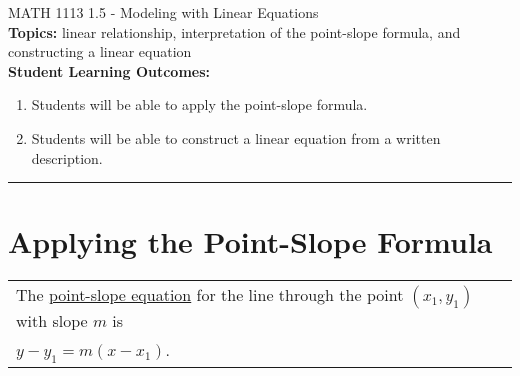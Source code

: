 \documentclass[11pt]{article}
\begin{document}
\noindent MATH 1113   \hfill 1.5 - Modeling with Linear Equations\\



\noindent \textbf{Topics:}  linear relationship, interpretation of the point-slope formula, and constructing a linear equation\\

\noindent \textbf{Student Learning Outcomes:}
\begin{enumerate}
\item Students will be able to apply the point-slope formula.
\item Students will be able to construct a linear equation from a written description.

\end{enumerate}

\hrule 
\vspace{5mm}
\section{Applying the Point-Slope Formula}

 \begin{tabular}{| l |}\hline
The \underline{point-slope equation} for the line through the point $(x_1,y_1)$ with slope $m$ is \\

 $y-y_1 = m(x-x_1)$. \\ \hline
\end{tabular} 
\end{document}
